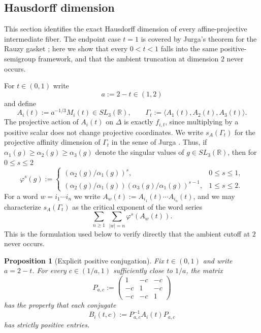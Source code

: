 \documentclass[11pt]{amsart}
\newtheorem{proposition}[proposition]{Proposition}
\theoremstyle{definition}
\newcommand{\R}{\mathbb{R}}
\newcommand{\D}{\Delta}
\begin{document}
\subsection{Hausdorff dimension}

This section identifies the exact Hausdorff dimension of every affine-projective intermediate fiber. The endpoint case $t=1$ is covered by Jurga's theorem for the Rauzy gasket \cite{Jurga2026}; here we show that every $0<t<1$ falls into the same positive-semigroup framework, and that the ambient truncation at dimension $2$ never occurs.

For $t\in(0,1)$ write
\[
 a:=2-t\in(1,2)
\]
and define
\[
A_i(t):=a^{-1/3}M_i(t)\in SL_3(\R),\qquad \Gamma_t:=\langle A_1(t),A_2(t),A_3(t)\rangle.
\]
The projective action of $A_i(t)$ on $\D$ is exactly $f_{i,t}$, since multiplying by a positive scalar does not change projective coordinates. We write $s_A(\Gamma_t)$ for the projective affinity dimension of $\Gamma_t$ in the sense of Jurga \cite{Jurga2026}. Thus, if $\alpha_1(g)\ge \alpha_2(g)\ge \alpha_3(g)$ denote the singular values of $g\in SL_3(\R)$, then for $0\le s\le 2$
\[
\varphi^s(g):=
\begin{cases}
(\alpha_2(g)/\alpha_1(g))^s,& 0\le s\le 1,\\[0.6ex]
(\alpha_2(g)/\alpha_1(g))(\alpha_3(g)/\alpha_1(g))^{s-1},& 1\le s\le 2.
\end{cases}
\]
For a word $w=i_1\cdots i_n$ we write $A_w(t):=A_{i_1}(t)\cdots A_{i_n}(t)$, and we may characterize $s_A(\Gamma_t)$ as the critical exponent of the word series
\[
\sum_{n\ge 1}\ \sum_{|w|=n}\varphi^s(A_w(t)).
\]
This is the formulation used below to verify directly that the ambient cutoff at $2$ never occurs.

\begin{proposition}[Explicit positive conjugation]\label{prop:positiveconj}
Fix $t\in(0,1)$ and write $a=2-t$. For every $c\in(1/a,1)$ sufficiently close to $1/a$, the matrix
\[
P_{a,c}:=\begin{pmatrix}
1&-c&-c\\
-c&1&-c\\
-c&-c&1
\end{pmatrix}
\]
has the property that each conjugate
\[
B_i(t,c):=P_{a,c}^{-1}A_i(t)P_{a,c}
\]
has strictly positive entries.
\end{proposition}
\end{document}
